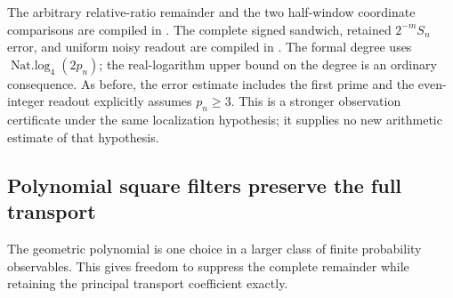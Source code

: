 \documentclass[11pt]{article}
\theoremstyle{definition}
\begin{document}
\begin{flushleft}
The arbitrary relative-ratio remainder and the two half-window
coordinate comparisons are compiled in
.
The complete signed sandwich, retained $2^{-m}S_n$ error, and uniform
noisy readout are compiled in
.
The formal degree uses $\operatorname{Nat.log}_4(2p_n)$;
the real-logarithm upper bound on the degree is an ordinary consequence.
As before, the error estimate includes the first prime and the
even-integer readout explicitly assumes $p_n\ge3$.
This is a stronger observation certificate under the same localization
hypothesis; it supplies no new arithmetic estimate of that hypothesis.
\end{flushleft}

\subsection{Polynomial square filters preserve the full transport}

The geometric polynomial is one choice in a larger class of finite
probability observables. This gives freedom to suppress the complete
remainder while retaining the principal transport coefficient exactly.
\end{document}
